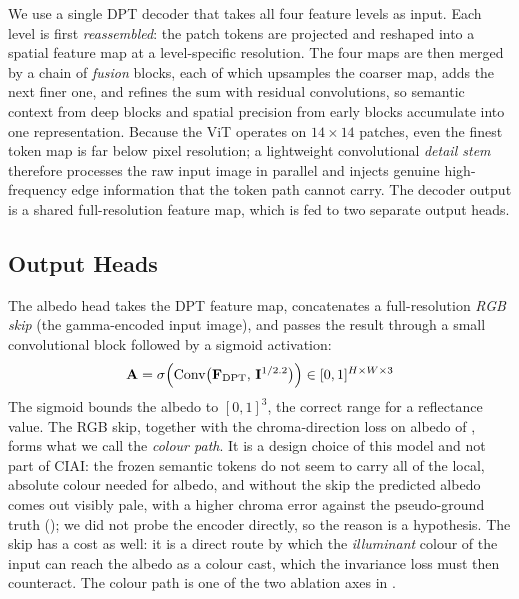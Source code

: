 We use a single DPT decoder that takes all four feature levels as input.
Each level is first \emph{reassembled}: the patch tokens are projected and
reshaped into a spatial feature map at a level-specific resolution.
The four maps are then merged by a chain of \emph{fusion} blocks, each of
which upsamples the coarser map, adds the next finer one, and refines the sum
with residual convolutions, so semantic context from deep blocks and spatial
precision from early blocks accumulate into one representation.
Because the ViT operates on $14 \times 14$ patches, even the finest token map
is far below pixel resolution; a lightweight convolutional \emph{detail stem}
therefore processes the raw input image in parallel and injects genuine
high-frequency edge information that the token path cannot carry.
The decoder output is a shared full-resolution feature map, which is fed to
two separate output heads.

\subsection{Output Heads}

The albedo head takes the DPT feature map, concatenates a full-resolution
\emph{RGB skip} (the gamma-encoded input image), and passes the result through
a small convolutional block followed by a sigmoid activation:
\begin{equation}
  \mathbf{A} = \sigma\Bigl(\text{Conv}\bigl(\mathbf{F}_{\text{DPT}},\,
               \mathbf{I}^{1/2.2}\bigr)\Bigr) \in [0, 1]^{H \times W \times 3}
  \label{eq:albedo_head}
\end{equation}
The sigmoid bounds the albedo to $[0,1]^3$, the correct range for a reflectance
value.
The RGB skip, together with the chroma-direction loss on albedo of
, forms what we call the \emph{colour path}. It is a design choice of this
model and not part of CIAI: the frozen semantic tokens do not seem to carry all of the
local, absolute colour needed for albedo, and without the skip the predicted albedo comes out visibly pale, with a
higher chroma error against the pseudo-ground truth (); we did not probe the encoder directly, so the reason is a
hypothesis. The skip has a cost as well: it is a direct route by which the
\emph{illuminant} colour of the input can reach the albedo as a colour cast, which the
invariance loss must then counteract. The colour path is one of the two ablation axes in
.

